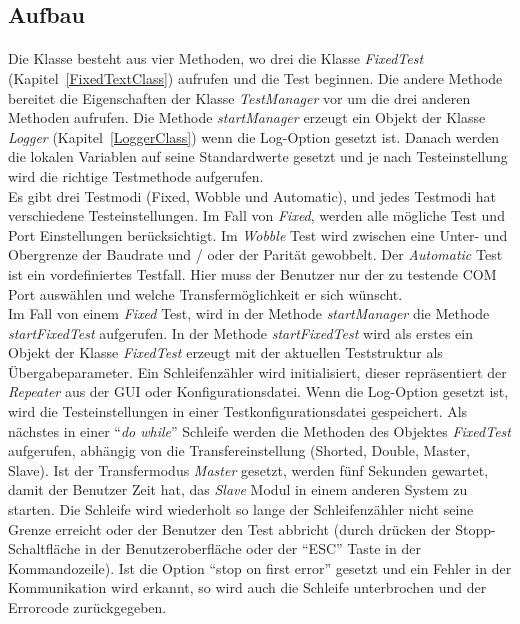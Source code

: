 \subsection{Aufbau}
\paragraph{}

Die Klasse besteht aus vier Methoden, wo drei die Klasse \textit{FixedTest} (Kapitel~\ref{FixedTextClass}) aufrufen und die Test beginnen. Die andere Methode bereitet die Eigenschaften der Klasse \textit{TestManager} vor um die drei anderen Methoden aufrufen. Die Methode \textit{startManager} erzeugt ein Objekt der Klasse \textit{Logger} (Kapitel~\ref{LoggerClass}) wenn die Log-Option gesetzt ist. Danach werden die lokalen Variablen auf seine Standardwerte gesetzt und je nach Testeinstellung wird die richtige Testmethode aufgerufen.\\

Es gibt drei Testmodi (Fixed, Wobble und Automatic), und jedes Testmodi hat verschiedene Testeinstellungen. Im Fall von \textit{Fixed}, werden alle mögliche Test und Port Einstellungen berücksichtigt. Im \textit{Wobble} Test wird zwischen eine Unter- und Obergrenze der Baudrate und / oder der Parität gewobbelt. Der \textit{Automatic} Test ist ein vordefiniertes Testfall. Hier muss der Benutzer nur der zu testende COM Port auswählen und welche Transfermöglichkeit er sich wünscht.\\

Im Fall von einem \textit{Fixed} Test, wird in der Methode \textit{startManager} die Methode \textit{startFixedTest} aufgerufen. In der Methode \textit{startFixedTest} wird als erstes ein Objekt der Klasse \textit{FixedTest} erzeugt mit der aktuellen Teststruktur als Übergabeparameter. Ein Schleifenzähler wird initialisiert, dieser repräsentiert der \textit{Repeater} aus der GUI oder Konfigurationsdatei. Wenn die Log-Option gesetzt ist, wird die Testeinstellungen in einer Testkonfigurationsdatei gespeichert. Als nächstes in einer "`\textit{do while}"' Schleife werden die Methoden des Objektes \textit{FixedTest} aufgerufen, abhängig von die  Transfereinstellung (Shorted, Double, Master, Slave). Ist der Transfermodus \textit{Master} gesetzt, werden fünf Sekunden gewartet, damit der Benutzer Zeit hat, das \textit{Slave} Modul in einem anderen System zu starten. Die Schleife wird wiederholt so lange der Schleifenzähler nicht seine Grenze erreicht oder der Benutzer den Test abbricht (durch drücken der Stopp-Schaltfläche in der Benutzeroberfläche oder der "`ESC"' Taste in der Kommandozeile). Ist die Option "`stop on first error"' gesetzt und ein Fehler in der Kommunikation wird erkannt, so wird auch die Schleife unterbrochen und der Errorcode zurückgegeben.\\

